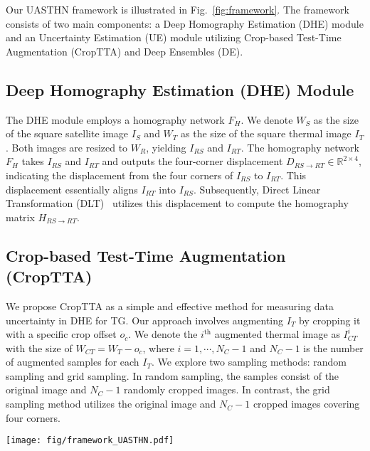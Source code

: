 Our UASTHN framework is illustrated in Fig.~\ref{fig:framework}. The framework consists of two main components: a Deep Homography Estimation (DHE) module and an Uncertainty Estimation (UE) module utilizing Crop-based Test-Time Augmentation (CropTTA) and Deep Ensembles (DE).

\subsection{Deep Homography Estimation (DHE) Module}
The DHE module employs a homography network $F_H$. We denote $W_S$ as the size of the square satellite image $I_S$ and $W_T$ as the size of the square thermal image $I_T$. Both images are resized to $W_R$, yielding $I_{RS}$ and $I_{RT}$. The homography network $F_H$ takes $I_{RS}$ and $I_{RT}$ and outputs the four-corner displacement $D_{RS\rightarrow RT} \in \mathbb{R}^{2 \times 4}$, indicating the displacement from the four corners of $I_{RS}$ to $I_{RT}$. This displacement essentially aligns $I_{RT}$ into $I_{RS}$. Subsequently, Direct Linear Transformation (DLT)~\cite{ABDELAZIZ2015103} utilizes this displacement to compute the homography matrix $H_{RS\rightarrow RT}$.

\subsection{Crop-based Test-Time Augmentation (CropTTA)}

We propose CropTTA as a simple and effective method for measuring data uncertainty in DHE for TG. Our approach involves augmenting $I_T$ by cropping it with a specific crop offset $o_c$. We denote the $i^\text{th}$ augmented thermal image as $I^i_{CT}$ with the size of $W_{CT} = W_T - o_c$, where $i=1,\cdots,N_C-1$ and $N_C-1$ is the number of augmented samples for each $I_T$. We explore two sampling methods: random sampling and grid sampling. In random sampling, the samples consist of the original image and $N_C-1$ randomly cropped images. In contrast, the grid sampling method utilizes the original image and $N_C-1$ cropped images covering four corners.

\begin{figure*}
    \centering
    \texttt{[image: fig/framework\_UASTHN.pdf]}
    \caption{UASTHN framework: CropTTA augments thermal images, and network $F_H$ with an UE module calculates aggregated displacements ($\tilde D_{RS\rightarrow RT}$) and data uncertainty ($U^\textrm{TTA}_{RS\rightarrow RT}$). $U^\textrm{TTA}_{RS\rightarrow RT}$ is used to reject samples with high uncertainty. Optionally, DE estimates model uncertainty ($U^\textrm{DE}_{RS\rightarrow RT}$), which can be combined with CropTTA for comprehensive UE.}
    \label{fig:framework}
    \vspace{-15pt}
\end{figure*}

